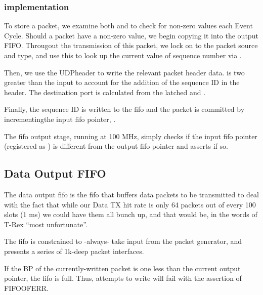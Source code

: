 \subsubsection{implementation}
To store a packet, we examine both  and
 to check for non-zero values each Event Cycle.
Should a packet have a non-zero value, we begin copying it into the
output FIFO. Througout the transmission of this packet, we lock on to
the packet source and type, and use this to look up the current value
of sequence number via  .

Then, we use the UDPheader to write the relevant packet header data.
 is two greater than the input  to
account for the addition of the sequence ID in the header. The
destination port is calculated from the latched  and
.

Finally, the sequence ID is written to the fifo and the packet is
committed by incrementingthe input fifo pointer, .

The fifo output stage, running at 100 MHz, simply checks if the input
fifo pointer (registered as ) is different from the
output fifo pointer and asserts  if so.

\subsection{Data Output FIFO}
The data output fifo is the fifo that buffers data packets to be
transmitted to deal with the fact that while our Data TX hit rate is
only 64 packets out of every 100 slots (1 ms) we could have them all
bunch up, and that would be, in the words of T-Rex ``most
unfortunate''.

The fifo is constrained to -always- take input from the packet
generator, and presents a series of 1k-deep packet interfaces.

If the BP of the currently-written packet is one less than the current output pointer, the fifo is full. Thus, attempts to write will fail with the assertion of FIFOOFERR. 


